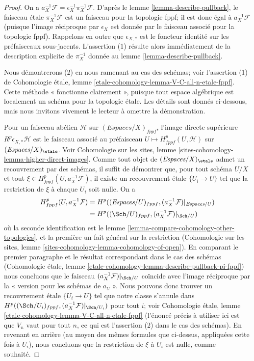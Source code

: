 \begin{proof}
On a $a_X^{-1}\mathcal{F} = \epsilon_X^{-1} \pi_X^{-1}\mathcal{F}$.
D'après le lemme \ref{lemma-describe-pullback}, le faisceau étale
$\pi_X^{-1}\mathcal{F}$ est un faisceau pour la topologie fppf; il est donc
égal à $a_X^{-1}\mathcal{F}$ (puisque l'image réciproque par $\epsilon_X$
est donnée par le faisceau associé pour la topologie fppf).
Rappelons en outre que $\epsilon_{X, *}$ est le foncteur identité
sur les préfaisceaux sous-jacents.
L'assertion (1) résulte alors immédiatement de la description explicite de
$\pi_X^{-1}$ donnée au lemme \ref{lemma-describe-pullback}.

\medskip\noindent
Nous démontrerons (2) en nous ramenant au cas des schémas; voir l'assertion (1)
de Cohomologie étale, lemme
\ref{etale-cohomology-lemma-V-C-all-n-etale-fppf}.
Cette méthode « fonctionne clairement », puisque tout espace algébrique est
localement un schéma pour la topologie étale. Les détails sont donnés ci-dessous,
mais nous invitons vivement le lecteur à omettre la démonstration.

\medskip\noindent
Pour un faisceau abélien $\mathcal{H}$ sur $(\textit{Espaces}/X)_{fppf}$,
l'image directe supérieure $R^p\epsilon_{X, *}\mathcal{H}$ est le faisceau
associé au préfaisceau $U \mapsto H^p_{fppf}(U, \mathcal{H})$
sur $(\textit{Espaces}/X)_\etale$. Voir Cohomologie sur les sites, lemme
\ref{sites-cohomology-lemma-higher-direct-images}.
Comme tout objet de $(\textit{Espaces}/X)_\etale$ admet un recouvrement par des
schémas, il suffit de démontrer que, pour tout schéma $U/X$ et tout
$\xi \in H^p_{fppf}(U, a_X^{-1}\mathcal{F})$, il existe un recouvrement étale
$\{U_i \to U\}$ tel que la restriction de $\xi$ à chaque $U_i$ soit nulle.
On a
\begin{align*}
H^p_{fppf}(U, a_X^{-1}\mathcal{F})
& =
H^p((\textit{Espaces}/U)_{fppf}, (a_X^{-1}\mathcal{F})|_{\textit{Espaces}/U}) \\
& =
H^p((\Sch/U)_{fppf}, (a_X^{-1}\mathcal{F})|_{\Sch/U})
\end{align*}
où la seconde identification est le lemme
\ref{lemma-compare-cohomology-other-topologies}, et la première un fait général
sur la restriction (Cohomologie sur les sites, lemme
\ref{sites-cohomology-lemma-cohomology-of-open}).
En comparant le premier paragraphe et le résultat correspondant dans le cas
des schémas (Cohomologie étale, lemme
\ref{etale-cohomology-lemma-describe-pullback-pi-fppf})
nous concluons que le faisceau $(a_X^{-1}\mathcal{F})|_{\Sch/U}$
coïncide avec l'image réciproque par la « version pour les schémas de $a_U$ ».
Nous pouvons donc trouver un recouvrement étale $\{U_i \to U\}$ tel que notre
classe s'annule dans
$H^p((\Sch/U_i)_{fppf}, (a_X^{-1}\mathcal{F})|_{\Sch/U_i})$
pour tout $i$; voir Cohomologie étale, lemme
\ref{etale-cohomology-lemma-V-C-all-n-etale-fppf}
(l'énoncé précis à utiliser ici est que $V_n$ vaut pour tout $n$, ce qui est
l'assertion (2) dans le cas des schémas).
En revenant en arrière (au moyen des mêmes formules que ci-dessus, appliquées
cette fois à $U_i$), nous concluons que la restriction de $\xi$ à $U_i$
est nulle, comme souhaité.
\end{proof}

